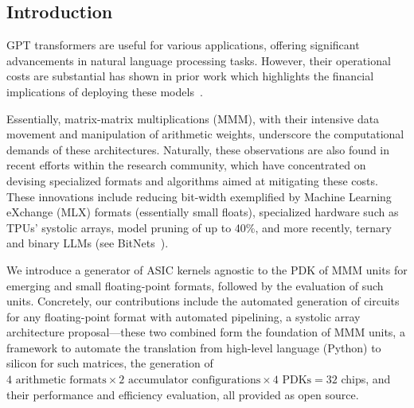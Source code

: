 \subsection{Introduction}
\label{sec:introduction}

GPT transformers are useful for various applications, offering significant advancements in natural language processing tasks.
However, their operational costs are substantial has shown in prior work which highlights the financial implications of deploying these models~\cite{luccioni2022estimating}.

Essentially, matrix-matrix multiplications (MMM), with their intensive data movement and manipulation of arithmetic weights, underscore the computational demands of these architectures.
Naturally, these observations are also found in recent efforts within the research community, which have concentrated on devising specialized formats and algorithms aimed at mitigating these costs.
These innovations include reducing bit-width exemplified by Machine Learning eXchange (MLX) formats (essentially small floats), specialized hardware such as TPUs' systolic arrays, model pruning of up to 40\%, and more recently, ternary and binary LLMs (see BitNets~\cite{ma2024era}).

We introduce a generator of ASIC kernels agnostic to the PDK of MMM units for emerging and small floating-point formats, followed by the evaluation of such units.
Concretely, our contributions include the automated generation of circuits for any floating-point format with automated pipelining, a systolic array architecture proposal—these two combined form the foundation of MMM units, a framework to automate the translation from high-level language (Python) to silicon for such matrices, the generation of $4 \text{ arithmetic formats} \times 2 \text{ accumulator configurations} \times 4 \text{ PDKs} = 32$ chips, and their performance and efficiency evaluation, all provided as open source.
